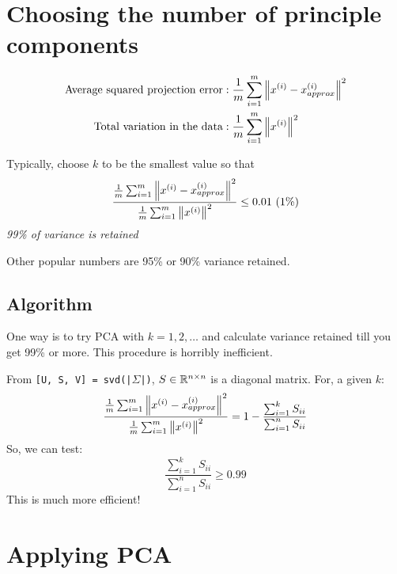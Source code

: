 \section{Choosing the number of principle components}
\begin{align*}
	\text{Average squared projection error} & :
	\frac{1}{m} \sum_{i=1}^m \left\Vert x^{(i)} - x_{approx}^{(i)} \right\Vert^2 \\
	\text{Total variation in the data}      & :
	\frac{1}{m} \sum_{i=1}^m \left\Vert x^{(i)} \right\Vert^2                    \\
\end{align*}

Typically, choose $k$ to be the smallest value so that
\begin{equation*}
	\frac{\frac{1}{m} \sum_{i=1}^m \left\Vert x^{(i)} - x_{approx}^{(i)} \right\Vert^2}
	{\frac{1}{m} \sum_{i=1}^m \left\Vert x^{(i)} \right\Vert^2} \le 0.01 \ (1\%)
\end{equation*}
\emph{99\% of variance is retained}

Other popular numbers are 95\% or 90\% variance retained.

\subsection{Algorithm}
One way is to try PCA with $k=1, 2, \dots$ and calculate variance retained till
you get 99\% or more. This procedure is horribly inefficient.

From \texttt{[U, S, V] = svd(|$\Sigma$|)},
$S \in \mathbb{R}^{n \times n}$ is a diagonal matrix. For, a given $k$:
\begin{equation*}
	\frac{\frac{1}{m} \sum_{i=1}^m \left\Vert x^{(i)} - x_{approx}^{(i)} \right\Vert^2}
	{\frac{1}{m} \sum_{i=1}^m \left\Vert x^{(i)} \right\Vert^2} = 1 -
	\frac{\sum_{i=1}^k S_{ii}}{\sum_{i=1}^n S_{ii}}
\end{equation*}
So, we can test:
\begin{equation*}
	\frac{\sum_{i=1}^k S_{ii}}{\sum_{i=1}^n S_{ii}} \ge 0.99
\end{equation*}
This is much more efficient!

\section{Applying PCA}
